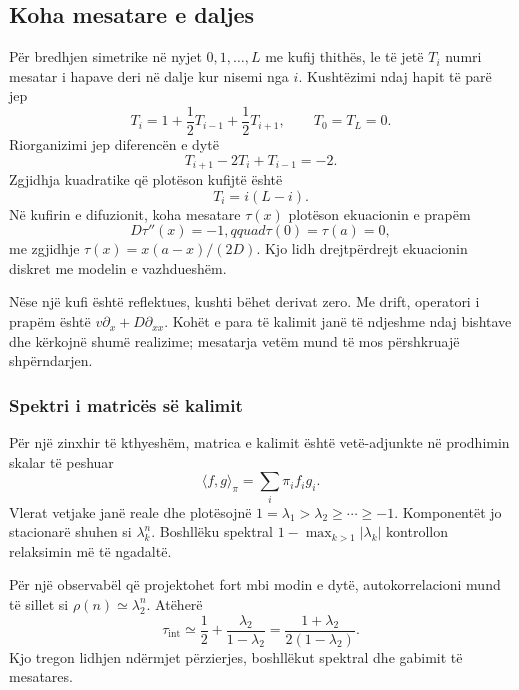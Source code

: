 \subsection{Koha mesatare e daljes}
Për bredhjen simetrike në nyjet $0,1,\ldots,L$ me kufij thithës, le të jetë $T_i$ numri mesatar i hapave deri në dalje kur nisemi nga $i$. Kushtëzimi ndaj hapit të parë jep
\begin{equation}
 T_i=1+\frac12T_{i-1}+\frac12T_{i+1},
 \qquad T_0=T_L=0.
\end{equation}
Riorganizimi jep diferencën e dytë
\begin{equation}
 T_{i+1}-2T_i+T_{i-1}=-2.
\end{equation}
Zgjidhja kuadratike që plotëson kufijtë është
\begin{equation}
 T_i=i(L-i).
\end{equation}
Në kufirin e difuzionit, koha mesatare $\tau(x)$ plotëson ekuacionin e prapëm
\begin{equation}
 D\tau''(x)=-1,qquad \tau(0)=\tau(a)=0,
\end{equation}
me zgjidhje $\tau(x)=x(a-x)/(2D)$. Kjo lidh drejtpërdrejt ekuacionin diskret me modelin e vazhdueshëm.

Nëse një kufi është reflektues, kushti bëhet derivat zero. Me drift, operatori i prapëm është $v\partial_x+D\partial_{xx}$. Kohët e para të kalimit janë të ndjeshme ndaj bishtave dhe kërkojnë shumë realizime; mesatarja vetëm mund të mos përshkruajë shpërndarjen.

\subsubsection{Spektri i matricës së kalimit}
Për një zinxhir të kthyeshëm, matrica e kalimit është vetë-adjunkte në prodhimin skalar të peshuar
\begin{equation}
 \langle f,g\rangle_\pi=\sum_i\pi_if_ig_i.
\end{equation}
Vlerat vetjake janë reale dhe plotësojnë $1=\lambda_1>\lambda_2\ge\cdots\ge-1$. Komponentët jo stacionarë shuhen si $\lambda_k^n$. Boshllëku spektral $1-\max_{k>1}|\lambda_k|$ kontrollon relaksimin më të ngadaltë.

Për një observabël që projektohet fort mbi modin e dytë, autokorrelacioni mund të sillet si $\rho(n)\simeq\lambda_2^n$. Atëherë
\begin{equation}
 \tau_{\mathrm{int}}\simeq\frac12+\frac{\lambda_2}{1-\lambda_2}
 =\frac{1+\lambda_2}{2(1-\lambda_2)}.
\end{equation}
Kjo tregon lidhjen ndërmjet përzierjes, boshllëkut spektral dhe gabimit të mesatares.

